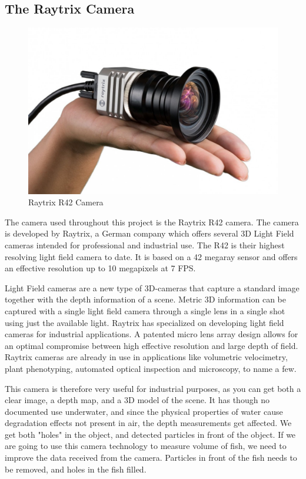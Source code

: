 \subsection{The Raytrix Camera}

\begin{figure}[h]
    \centering
    \includegraphics[width=.9\linewidth]{Images/raytrix_camera}
    \caption{Raytrix R42 Camera}
    \label{fig:raytrix_camera}
\end{figure}

The camera used throughout this project is the Raytrix R42 camera. The camera is developed by Raytrix, a German company which offers several 3D Light Field cameras intended for professional and industrial use. The R42 is their highest resolving light field camera to date. It is based on a 42 megaray sensor and offers an effective resolution up to 10 megapixels at 7 FPS. \cite{website:raytrix_r42}

Light Field cameras are a new type of 3D-cameras that capture a standard image together with the depth information of a scene. Metric 3D information can be captured with a single light field camera through a single lens in a single shot using just the available light. Raytrix has specialized on developing light field cameras for industrial applications. A patented micro lens array design allows for an optimal compromise between high effective resolution and large depth of field. Raytrix cameras are already in use in applications like volumetric velocimetry, plant phenotyping, automated optical inspection and microscopy, to name a few. \cite{website:raytrix_main}

This camera is therefore very useful for industrial purposes, as you can get both a clear image, a depth map, and a 3D model of the scene. It has though no documented use underwater, and since the physical properties of water cause degradation effects not present in air, the depth measurements get affected. We get both "holes" in the object, and detected particles in front of the object. If we are going to use this camera technology to measure volume of fish, we need to improve the data received from the camera. Particles in front of the fish needs to be removed, and holes in the fish filled.

